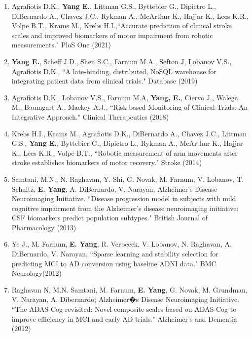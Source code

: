 \documentclass[letterpaper,9pt]{article}
\begin{document}
\begin{enumerate}


\item{{\small  Agrafiotis D.K., \textbf{Yang E.}, Littman G.S., Byttebier G., Dipietro L., DiBernardo A., Chavez J.C., Rykman A., McArthur K., Hajjar K., Lees K.R., Volpe B.T.,  Krams M., Krebs H.I.,``Accurate prediction of clinical stroke scales and improved biomarkers of motor impairment from robotic measurements." PloS One (2021)}}


\item{{\small \textbf{Yang E.}, Scheff J.D., Shen S.C., Farnum M.A., Sefton J, Lobanov V.S., Agrafiotis D.K., ``A late-binding, distributed, NoSQL warehouse for integrating patient data from clinical trials." Database (2019)}}

\item{{\small Agrafiotis D.K., Lobanov V.S., Farnum M.A, \textbf{Yang, E.}, Ciervo J., Walega M., Baumgart A., Mackey A.J., ``Risk-based Monitoring of Clinical Trials: An Integrative Approach." Clinical Therapeutics (2018)}}

\item{{\small Krebs H.I., Krams M., Agrafiotis D.K., DiBernardo A., Chavez J.C., Littman G.S., \textbf{Yang E.}, Byttebier G., Dipietro L., Rykman A., McArthur K., Hajjar K., Lees K.R., Volpe B.T., ``Robotic measurement of arm movements after stroke establishes biomarkers of motor recovery." Stroke (2014)}}

\item{{\small Samtani, M.N., N. Raghavan, Y. Shi, G. Novak, M. Farnum, V. Lobanov, T. Schultz, \textbf{E. Yang},  A. DiBernardo, V. Narayan, Alzheimer's Disease Neuroimaging Initiative. ``Disease progression model in subjects with mild cognitive impairment from the Alzheimer's disease neuroimaging initiative: CSF biomarkers predict population subtypes." British Journal of Pharmacology (2013)}}

\item{{\small Ye J., M. Farnum, \textbf{E. Yang}, R. Verbeeck, V. Lobanov, N. Raghavan,  A. DiBernardo, V. Narayan, ``Sparse learning and stability selection for predicting MCI to AD conversion using baseline ADNI data." BMC Neurology(2012)}}

\item{{\small Raghavan N, M.N. Samtani, M. Farnum, \textbf{E. Yang}, G. Novak, M. Grundman, V. Narayan, A. Dibernardo; Alzheimer�s Disease Neuroimaging Initiative. ``The ADAS-Cog revisited: Novel composite scales based on ADAS-Cog to improve efficiency in MCI and early AD trials." Alzheimer's and Dementia (2012)}}


\end{enumerate}
\end{document}
